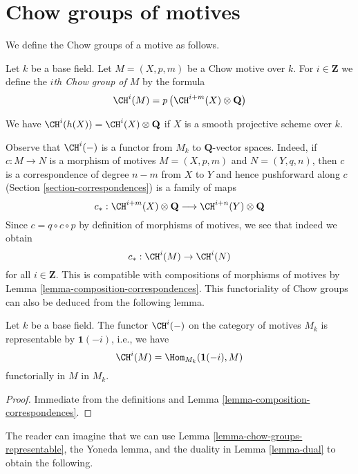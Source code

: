\section{Chow groups of motives}
\label{section-chow-groups-motives}

\noindent
We define the Chow groups of a motive as follows.

\begin{definition}
\label{definition-chow-group-motives}
Let $k$ be a base field. Let $M = (X, p, m)$ be a Chow motive over $k$.
For $i \in \mathbf{Z}$ we define the {\it $i$th Chow group of $M$}
by the formula
$$
\CH^i(M) = p\left(\CH^{i + m}(X) \otimes \mathbf{Q}\right)
$$
\end{definition}

\noindent
We have $\CH^i(h(X)) = \CH^i(X) \otimes \mathbf{Q}$
if $X$ is a smooth projective scheme over $k$.

\medskip\noindent
Observe that $\CH^i(-)$ is a functor from $M_k$ to $\mathbf{Q}$-vector spaces.
Indeed, if $c : M \to N$ is a morphism of motives
$M = (X, p, m)$ and $N = (Y, q, n)$, then $c$ is a correspondence of
degree $n - m$ from $X$ to $Y$ and hence pushforward along $c$
(Section \ref{section-correspondences}) is a family of maps
$$
c_* :
\CH^{i + m}(X) \otimes \mathbf{Q}
\longrightarrow
\CH^{i + n}(Y) \otimes \mathbf{Q}
$$
Since $c = q \circ c \circ p$ by definition of morphisms of motives,
we see that indeed we obtain
$$
c_* : \CH^i(M) \to \CH^i(N)
$$
for all $i \in \mathbf{Z}$. This is compatible with compositions of
morphisms of motives by Lemma \ref{lemma-composition-correspondences}.
This functoriality of Chow groups can also be deduced from the following
lemma.

\begin{lemma}
\label{lemma-chow-groups-representable}
Let $k$ be a base field. The functor $\CH^i(-)$ on the category
of motives $M_k$ is representable by $\mathbf{1}(-i)$, i.e., we
have
$$
\CH^i(M) = \Hom_{M_k}(\mathbf{1}(-i), M)
$$
functorially in $M$ in $M_k$.
\end{lemma}

\begin{proof}
Immediate from the definitions and
Lemma \ref{lemma-composition-correspondences}.
\end{proof}

\noindent
The reader can imagine that we can use
Lemma \ref{lemma-chow-groups-representable}, the Yoneda lemma, and
the duality in Lemma \ref{lemma-dual} to obtain the following.

